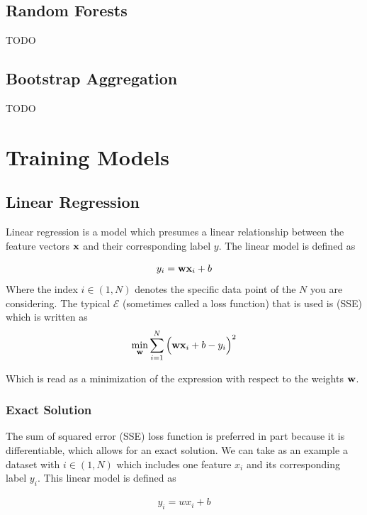 \subsection{Random Forests}
TODO
\subsection{Bootstrap Aggregation}
TODO


\section{Training Models}


\subsection{Linear Regression}
Linear regression is a model which presumes a linear relationship between the feature vectors $\textbf{x}$ and their corresponding label $y$. The linear model is defined as

\begin{align}
    y_i = \textbf{wx}_i +b
\end{align}
Where the index $i\in(1,N)$ denotes the specific data point of the $N$ you are considering. The typical  $\mathcal{E}$ (sometimes called a loss function) that is used is  (SSE) which is written as
\begin{align}
    	\min_{\textbf{w}}\sum_{i=1}^N\Big(\textbf{wx}_i +b - y_i\Big)^2
\end{align}

Which is read as a minimization of the expression with respect to the weights $\textbf{w}$. 


\subsubsection{Exact Solution}\label{lin-reg-exact}
The sum of squared error (SSE) loss function is preferred in part because it is differentiable, which allows for an exact solution. We can take as an example a dataset with $i\in(1,N)$ which includes one feature $x_i$ and its corresponding label $y_i$. This linear model is defined as

\begin{align}
y_i = wx_i + b
\end{align}

